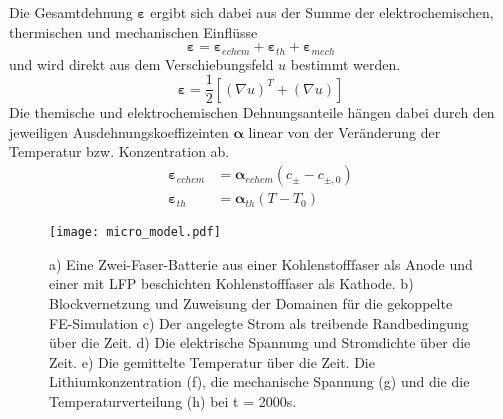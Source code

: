 Die Gesamtdehnung $\boldsymbol{\varepsilon}$ ergibt sich dabei aus der Summe der elektrochemischen, thermischen und mechanischen Einflüsse
\begin{equation}
    \boldsymbol{\varepsilon} = \boldsymbol{\varepsilon}_{echem} +\boldsymbol{\varepsilon}_{th} + \boldsymbol{\varepsilon}_{mech}
\end{equation}
und wird direkt aus dem Verschiebungsfeld $u$ bestimmt werden.
\begin{equation}
    \boldsymbol{\varepsilon} = \frac{1}{2}\left[\left(\nabla u\right)^T + \left(\nabla u\right)\right]
\end{equation}
Die themische und elektrochemischen Dehnungsanteile hängen dabei durch den jeweiligen Ausdehnungskoeffizeinten $\boldsymbol{\alpha}$ linear von der Veränderung der Temperatur bzw. Konzentration ab.
\begin{align}
    \boldsymbol{\varepsilon}_{echem} &= \boldsymbol{\alpha}_{echem} \left(c_{\pm}-c_{\pm,0}\right)\\
    \boldsymbol{\varepsilon}_{th}  &= \boldsymbol{\alpha}_{th}\left( T - T_0\right)
\end{align}

\begin{figure}[!h]
        \center
		\texttt{[image: micro\_model.pdf]}
		\caption{\label{fig:micro_model}a) Eine Zwei-Faser-Batterie aus einer Kohlenstofffaser als Anode und einer mit LFP beschichten Kohlenstofffaser als Kathode. b) Blockvernetzung und Zuweisung der Domainen für die gekoppelte FE-Simulation c) Der angelegte Strom als treibende Randbedingung über die Zeit. d) Die elektrische Spannung und Stromdichte über die Zeit. e) Die gemittelte Temperatur über die Zeit. Die Lithiumkonzentration (f), die mechanische Spannung (g) und die die Temperaturverteilung (h) bei t = 2000s.}
\end{figure}

